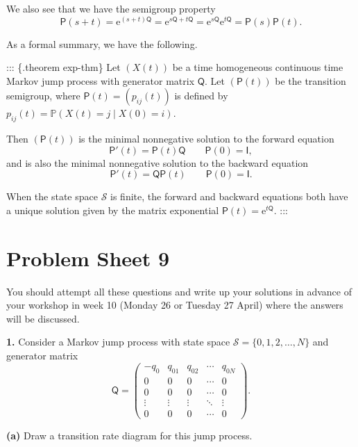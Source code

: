 \documentclass[
  a4paper,
]{article}
\newif\ifcomm\commtrue
\theoremstyle{definition}
\theoremstyle{definition}
\theoremstyle{definition}
\theoremstyle{remark}
\begin{document}
We also see that we have the semigroup property
\[ \mathsf P(s+t) = \mathrm{e}^{(s+t)\mathsf Q} = \mathrm{e}^{s \mathsf Q + t \mathsf Q} = \mathrm{e}^{s \mathsf Q}\mathrm{e}^{t \mathsf Q} = \mathsf P(s) \mathsf P(t) . \]

As a formal summary, we have the following.

::: \{.theorem exp-thm\}
Let \((X(t))\) be a time homogeneous continuous time Markov jump process with generator matrix \(\mathsf Q\). Let \((\mathsf P(t))\) be the transition semigroup, where \(\mathsf P(t) = (p_{ij}(t))\) is defined by \(p_{ij}(t) = \mathbb P(X(t) = j \mid X(0) = i)\).

Then \((\mathsf P(t))\) is the minimal nonnegative solution to the forward equation
\[ \mathsf P'(t) = \mathsf P(t) \mathsf Q \qquad \mathsf P(0) = \mathsf I , \]
and is also the minimal nonnegative solution to the backward equation
\[ \mathsf P'(t) = \mathsf Q \mathsf P(t) \qquad \mathsf P(0) = \mathsf I . \]

When the state space \(\mathcal S\) is finite, the forward and backward equations both have a unique solution given by the matrix exponential \(\mathsf P(t) = \mathrm{e}^{t \mathsf Q}\).
:::

\hypertarget{P09}{%
\section*{Problem Sheet 9}\label{P09}}

\commfalse

You should attempt all these questions and write up your solutions in advance of your workshop in week 10 (Monday 26 or Tuesday 27 April) where the answers will be discussed.

\textbf{1.} Consider a Markov jump process with state space \(\mathcal S = \{0,1,2,\dots,N\}\) and generator matrix
\[ \mathsf Q = \begin{pmatrix} -q_0 & q_{01} & q_{02} & \cdots & q_{0N} \\
0    & 0      & 0      & \cdots & 0      \\
0    & 0      & 0      & \cdots & 0      \\
\vdots & \vdots & \vdots & \ddots & \vdots \\
0    & 0      & 0      & \cdots & 0  \end{pmatrix} . \]

\textbf{(a)} Draw a transition rate diagram for this jump process.
\end{document}
